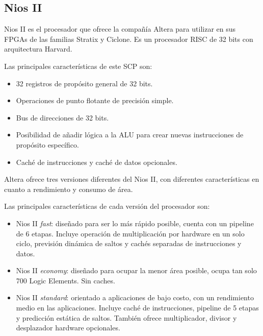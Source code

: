 	\subsection{Nios II}

Nios II es el procesador que ofrece la compañía Altera para utilizar en sus FPGAs de las familias Stratix y Ciclone. Es un procesador RISC de 32 bits con arquitectura Harvard.

Las principales características de este SCP son:
		\begin{itemize}
		  \item  32 registros de propósito general de 32 bits.
	 	 \item  Operaciones de punto flotante de precisión simple.
	 	 \item  Bus de direcciones de 32 bits.
		 \item  Posibilidad de añadir lógica a la ALU para crear nuevas instrucciones de propósito específico.
 		\item Caché de instrucciones y caché de datos opcionales.
		\end{itemize}
  
Altera ofrece tres versiones diferentes del Nios II, con diferentes características en cuanto a rendimiento y consumo de área.

Las principales características de cada versión del procesador son: 
		\begin{itemize}
		  \item Nios II \textit{fast}: diseñado para ser lo más rápido posible, cuenta con un pipeline de 6 etapas. Incluye operación de multiplicación por hardware en un solo ciclo, previsión dinámica de saltos y cachés separadas de instrucciones y datos.
	 	 \item Nios II \textit{economy}: diseñado para ocupar la menor área posible, ocupa tan solo 700 Logic Elements. Sin caches.
 		\item Nios II \textit{standard}: orientado a aplicaciones de bajo costo, con un rendimiento medio en las aplicaciones. Incluye caché de instrucciones, pipeline de 5 etapas y predicción estática de saltos. También ofrece multiplicador, divisor y desplazador hardware opcionales.
		\end{itemize}

